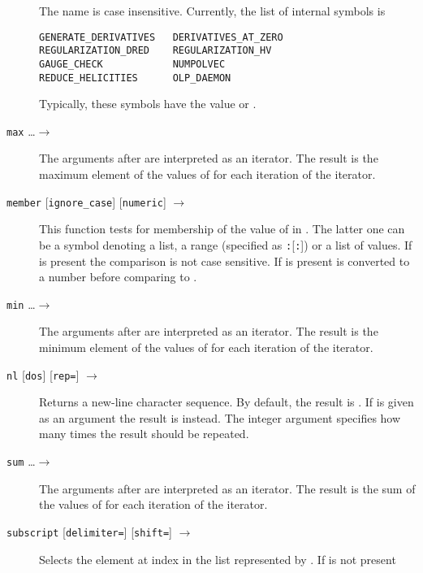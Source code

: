 \documentclass[11pt,a4paper]{refrep}
\begin{document}
\begin{description}
   The name is case insensitive. Currently, the list of internal symbols
   is
\begin{verbatim}
GENERATE_DERIVATIVES   DERIVATIVES_AT_ZERO
REGULARIZATION_DRED    REGULARIZATION_HV
GAUGE_CHECK            NUMPOLVEC
REDUCE_HELICITIES      OLP_DAEMON
\end{verbatim}
   Typically, these symbols have the value  or .
\item[\texttt{max} \synt{var} \ldots $\to$ \synt{string}] The arguments
   after  are interpreted as an iterator. The result is the
   maximum element
   of the values of  for each iteration of the iterator.
\item[\texttt{member} \synt{needle} \synt{haystack} {[\texttt{ignore\_case}]}
{[\texttt{numeric}]} $\to$ \synt{logical}]
   This function tests for membership of the value of 
   in . The latter one can be a symbol denoting a list,
   a range (specified as \texttt{:}[\texttt{:}])
   or a list of values. If  is present the comparison
   is not case sensitive. If  is present 
   is converted to a number before comparing to .
\item[\texttt{min} \synt{var} \ldots $\to$ \synt{string}] The arguments
   after  are interpreted as an iterator. The result is the
   minimum element
   of the values of  for each iteration of the iterator.
\item[\texttt{nl} {[\texttt{dos}]} {[\texttt{rep=}\synt{factor}]}
   $\to$ \synt{string}]
   Returns a new-line character sequence. By default, the result
   is \lit{\\n}. If  is given as an argument the result is
   \lit{\\r\\n} instead. The integer argument  specifies
   how many times the result should be repeated.
\item[\texttt{sum} \synt{var} \ldots $\to$ \synt{integer}] The arguments
   after  are interpreted as an iterator. The result is the
   sum of the values of  for each iteration of the iterator.
\item[\texttt{subscript} \synt{list} \synt{index}
   {[\texttt{delimiter=}\synt{delimiter}]}
   {[\texttt{shift=}\synt{shift}]} $\to$ \synt{string}]
   Selects the element at index  in the list
   represented by . If  is not present

\end{description}
\end{document}
